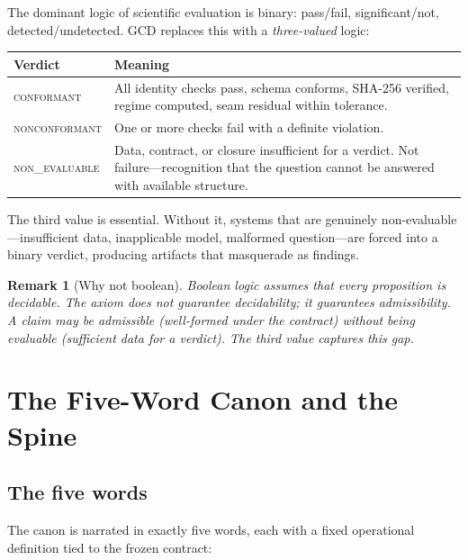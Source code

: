 \documentclass[
  aps,
  prd,
  twocolumn,
  superscriptaddress,
  nofootinbib,
  floatfix
]{revtex4-2}
\newtheorem{remark}{Remark}
\newcommand{\regime}[1]{\textrm{\upshape\scshape#1}}
\newcommand{\conform}{\regime{conformant}}
\newcommand{\nonconform}{\regime{nonconformant}}
\begin{document}
The dominant logic of scientific evaluation is binary: pass/fail,
significant/not, detected/undetected.  GCD replaces this with a
\emph{three-valued} logic:

\begin{center}
{\small\begin{tabular}{@{}lp{5.5cm}@{}}
\toprule
\textbf{Verdict} & \textbf{Meaning} \\
\midrule
\conform{} &
  All identity checks pass, schema conforms, SHA-256 verified,
  regime computed, seam residual within tolerance. \\[0.3em]
\nonconform{} &
  One or more checks fail with a definite violation. \\[0.3em]
\regime{non\_evaluable} &
  Data, contract, or closure insufficient for a verdict.
  Not failure---recognition that the question cannot be
  answered with available structure. \\
\bottomrule
\end{tabular}}
\end{center}

The third value is essential.  Without it, systems that are
genuinely non-evaluable---insufficient data, inapplicable model,
malformed question---are forced into a binary verdict, producing
artifacts that masquerade as findings.

\begin{remark}[Why not boolean]
Boolean logic assumes that every proposition is decidable.  The
axiom does not guarantee decidability; it guarantees
\emph{admissibility}.  A claim may be admissible (well-formed under
the contract) without being evaluable (sufficient data for a
verdict).  The third value captures this gap.
\end{remark}


\section{The Five-Word Canon and the Spine}\label{sec:canon}

\subsection{The five words}

The canon is narrated in exactly five words, each with a fixed
operational definition tied to the frozen contract:
\end{document}
